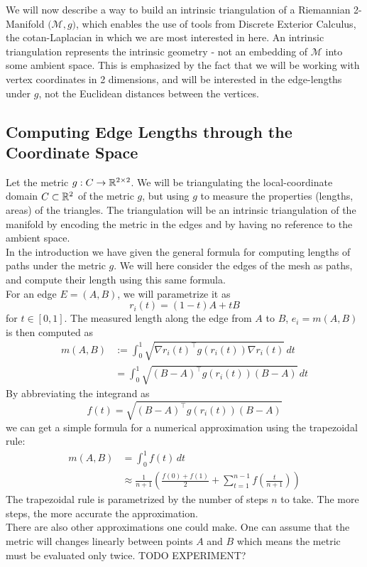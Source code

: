 \ifdefined\COMPILINGFROMMAIN
\else
    
    
\fi
We will now describe a way to build an intrinsic triangulation of a Riemannian 2-Manifold $\big(\mathcal{M}, g\big)$, which enables the use of tools from Discrete Exterior Calculus, the cotan-Laplacian in which we are most interested in here. An intrinsic triangulation represents the intrinsic geometry - not an embedding of $\mathcal{M}$ into some ambient space. This is emphasized by the fact that we will be working with vertex coordinates in 2 dimensions, and will be interested in the edge-lengths under $g$, not the Euclidean distances between the vertices.
\\
\subsection*{Computing Edge Lengths through the Coordinate Space} 
Let the metric $g : C \to \mathbb{R}^{2\times2}$. We will be triangulating the local-coordinate domain $C\subset \mathbb{R}^2$ of the metric $g$, but using $g$ to measure the properties (lengths, areas) of the triangles. The triangulation will be an intrinsic triangulation of the manifold by encoding the metric in the edges and by having no reference to the ambient space.
\\
In the introduction we have given the general formula for computing lengths of paths under the metric $g$. We will here consider the edges of the mesh as paths, and compute their length using this same formula. 
\\
For an edge $E = (A, B)$, we will parametrize it as $$r_i(t) = (1-t)A + tB$$ for $t\in[0,1]$. The measured length along the edge from $A$ to $B$, $e_i = m(A, B)$ is then computed as
\begin{align*}
    m(A, B) &:= \int_{0}^{1}\! \sqrt{\nabla r_i(t)^\top g(r_i(t)) \nabla r_i(t)} \, dt
    \\ 
    &= \int_{0}^{1}\! \sqrt{(B\!-\!A)^\top g(r_i(t)) (B\!-\!A)} \, dt
\end{align*}
By abbreviating the integrand as $$f(t) = \sqrt{(B\!-\!A)^\top g(r_i(t)) (B\!-\!A)}$$ we can get a simple formula for a numerical approximation using the trapezoidal rule:
\begin{align*}
    m(A, B) &= \int_{0}^{1}\! f(t) \, dt 
    \\
    &\approx \frac{1}{n\!+\!1}\!\left(\frac{f(0)\!+\!f(1)}{2} +  \sum_{t=1}^{n-1} f\!\left(\frac{t}{n\!+\!1}\right)  \right) 
\end{align*}
The trapezoidal rule is parametrized by the number of steps $n$ to take. The more steps, the more accurate the approximation.
\\ There are also other approximations one could make. One can assume that the metric will changes linearly between points $A$ and $B$ which means the metric must be evaluated only twice.
TODO EXPERIMENT?


